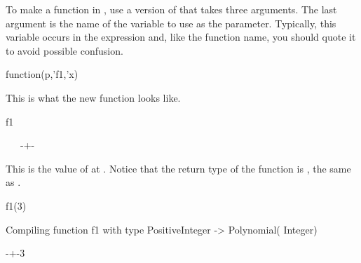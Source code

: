 \begin{xtc}
\begin{xtccomment}
To make a function in , use a version of
 that takes three arguments.
The last argument is the name of the variable to use as the parameter.
Typically, this variable occurs in the expression and, like the function
name, you should quote it to avoid possible confusion.
\end{xtccomment}
\begin{spadsrc}
function(p,'f1,'x) 
\end{spadsrc}
\begin{TeXOutput}
\begin{fricasmath}{5}
%
\end{fricasmath}
\end{TeXOutput}
\end{xtc}
\begin{xtc}
\begin{xtccomment}
This is what the new function looks like.
\end{xtccomment}
\begin{spadsrc}
f1 
\end{spadsrc}
\begin{TeXOutput}
\begin{fricasmath}{6}
\ \ \SYMBOL{==}\ -{}+-{}%
\end{fricasmath}
\end{TeXOutput}
\end{xtc}
\begin{xtc}
\begin{xtccomment}
This is the value of  at .
Notice that the return type of the function is
, the same as .
\end{xtccomment}
\begin{spadsrc}
f1(3) 
\end{spadsrc}
\begin{MessageOutput}
   Compiling function f1 with type PositiveInteger -> Polynomial(
      Integer) 
\end{MessageOutput}
\begin{TeXOutput}
\begin{fricasmath}{7}
-{}+-{3}%
\end{fricasmath}
\end{TeXOutput}
\end{xtc}
